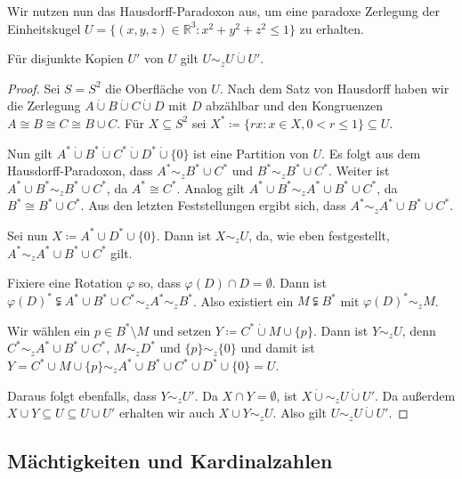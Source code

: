 Wir nutzen nun das Hausdorff-Paradoxon aus, um eine paradoxe Zerlegung der Einheitskugel $U=\{(x,y,z)\in\mathbb{R}^3 : x^2+y^2+z^2\leq 1\}$ zu erhalten.

\begin{satz}
	Für disjunkte Kopien $U'$ von $U$ gilt $U\sim_z U\dot{\cup} U'$.
\end{satz}
\begin{proof}
	Sei $S=S^2$ die Oberfläche von $U$. Nach dem Satz von Hausdorff haben wir die Zerlegung $A\dot{\cup}B\dot{\cup}C\dot{\cup}D$ mit $D$ abzählbar und den Kongruenzen $A\cong B\cong C\cong B\cup C$. Für $X\subseteq S^2$ sei $X^\ast\coloneqq\{rx:x\in X, 0<r\leq 1\}\subseteq U$.
	
	Nun gilt $A^\ast \dot{\cup} B^\ast \dot{\cup} C^\ast \dot{\cup} D^\ast \dot{\cup} \{0\}$ ist eine Partition von $U$. Es folgt aus dem Hausdorff-Paradoxon, dass $A^\ast\sim_z B^\ast\cup C^\ast$ und $B^\ast\sim_z B^\ast\cup C^\ast$. Weiter ist $A^\ast\cup B^\ast\sim_z B^\ast \cup C^\ast$, da $A^\ast\cong C^\ast$. Analog gilt $A^\ast\cup B^\ast \sim_z A^\ast \cup B^\ast \cup C^\ast$, da $B^\ast\cong B^\ast\cup C^\ast$. Aus den letzten Feststellungen ergibt sich, dass $A^\ast\sim_z A^\ast\cup B^\ast \cup C^\ast$.
	
	Sei nun $X\coloneqq A^\ast \cup D^\ast \cup \{0\}$. Dann ist $X\sim_z U$, da, wie eben festgestellt, $A^\ast \sim_z A^\ast \cup B^\ast \cup C^\ast$ gilt.
	
	Fixiere eine Rotation $\varphi$ so, dass $\varphi(D)\cap D =\emptyset$. Dann ist $\varphi(D)^\ast\subsetneqq A^\ast\cup B^\ast\cup C^\ast \sim_z A^\ast \sim_z B^\ast$. Also existiert ein $M\subsetneqq B^\ast$ mit $\varphi(D)^\ast\sim_z M$.
	
	Wir wählen ein $p\in B^\ast\setminus M$ und setzen $Y\coloneqq C^\ast \dot{\cup} M \cup \{p\}$. Dann ist $Y\sim_z U$, denn $C^\ast \sim_z A^\ast \cup B^\ast \cup C^\ast$, $M\sim_z D^\ast$ und $\{p\}\sim_z\{0\}$ und damit ist $Y=C^\ast\cup M\cup\{p\}\sim_zA^\ast\cup B^\ast \cup C^\ast \cup D^\ast \cup \{0\}=U$.
	
	Daraus folgt ebenfalls, dass $Y\sim_z U'$. Da $X\cap Y=\emptyset$, ist $X\dot{\cup}\sim_z U\dot{\cup} U'$. Da außerdem $X\cup Y\subseteq U \subseteq U\cup U'$ erhalten wir auch $X\cup Y \sim_z U$. Also gilt $U\sim_z U\dot{\cup} U'$.
\end{proof}

\subsection{Mächtigkeiten und Kardinalzahlen}

